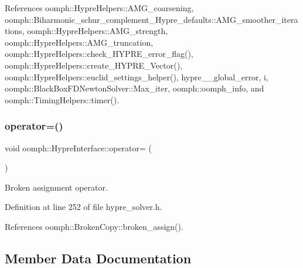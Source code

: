 References oomph\+::\+Hypre\+Helpers\+::\+A\+M\+G\+\_\+coarsening, oomph\+::\+Biharmonic\+\_\+schur\+\_\+complement\+\_\+\+Hypre\+\_\+defaults\+::\+A\+M\+G\+\_\+smoother\+\_\+iterations, oomph\+::\+Hypre\+Helpers\+::\+A\+M\+G\+\_\+strength, oomph\+::\+Hypre\+Helpers\+::\+A\+M\+G\+\_\+truncation, oomph\+::\+Hypre\+Helpers\+::check\+\_\+\+H\+Y\+P\+R\+E\+\_\+error\+\_\+flag(), oomph\+::\+Hypre\+Helpers\+::create\+\_\+\+H\+Y\+P\+R\+E\+\_\+\+Vector(), oomph\+::\+Hypre\+Helpers\+::euclid\+\_\+settings\+\_\+helper(), hypre\+\_\+\+\_\+global\+\_\+error, i, oomph\+::\+Black\+Box\+F\+D\+Newton\+Solver\+::\+Max\+\_\+iter, oomph\+::oomph\+\_\+info, and oomph\+::\+Timing\+Helpers\+::timer().

\mbox{\label{classoomph_1_1HypreInterface_adb32af31e0e519181f971410740520c9}} 
\subsubsection{\texorpdfstring{operator=()}{operator=()}}
{\footnotesize\ttfamily void oomph\+::\+Hypre\+Interface\+::operator= (\begin{DoxyParamCaption}\item[{const \hyperlink{classoomph_1_1HypreInterface}{Hypre\+Interface} \&}]{ }\end{DoxyParamCaption})\hspace{0.3cm}{\ttfamily [inline]}}



Broken assignment operator. 



Definition at line 252 of file hypre\+\_\+solver.\+h.



References oomph\+::\+Broken\+Copy\+::broken\+\_\+assign().



\subsection{Member Data Documentation}
\mbox{\label{classoomph_1_1HypreInterface_a0a75db2a70cfd31653be6681abccffbf}} 
